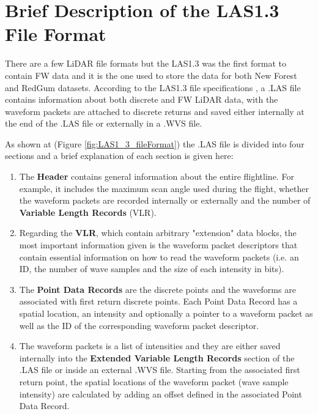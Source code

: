 \documentclass{subfiles}
\begin{document}
     
    \section{ Brief Description of the LAS1.3 File Format} \label{sec:LAS1_3_specifications}
    
    \par There are a few LiDAR file formats but the LAS1.3 was the first format to contain FW data and it is the one used to store the data for both  New Forest and RedGum datasets. According to the LAS1.3 file specifications \cite{LAS1.3specifications}, a .LAS file contains information about both discrete and FW LiDAR data, with the waveform packets are attached to discrete returns and saved either internally at the end of the .LAS file or externally in a .WVS file. 
    
    \par As shown at (Figure \ref{fig:LAS1_3_fileFormat}) the .LAS file is divided into four sections and a brief explanation of each section is given here:
    \begin{enumerate}
    \item  The \textbf{Header} contains general information about the entire flightline. For example, it includes the maximum scan angle used during the flight, whether the waveform packets are recorded internally or externally  and the number of \textbf{Variable Length Records} (VLR). 
    \item Regarding the \textbf{VLR}, which contain arbitrary "extension" data blocks, the most important information given is the waveform packet descriptors that contain essential information on how to read the waveform packets (i.e. an ID, the number of wave samples and the size of each intensity in bits). 
    \item The \textbf{Point Data Records} are the discrete points and the waveforms are associated with first return discrete points. Each Point Data Record has a spatial location, an intensity and optionally a pointer to a waveform packet as well as the ID of the corresponding waveform packet descriptor. 
    \item The waveform packets is a list of intensities and they are either saved internally into the \textbf{Extended Variable Length Records} section of the .LAS file or inside an external .WVS file. Starting from the associated first return point, the spatial locations of the waveform packet (wave sample intensity) are calculated by adding an offset defined in the associated Point Data Record. 
    \end{enumerate}  
    
\end{document}
